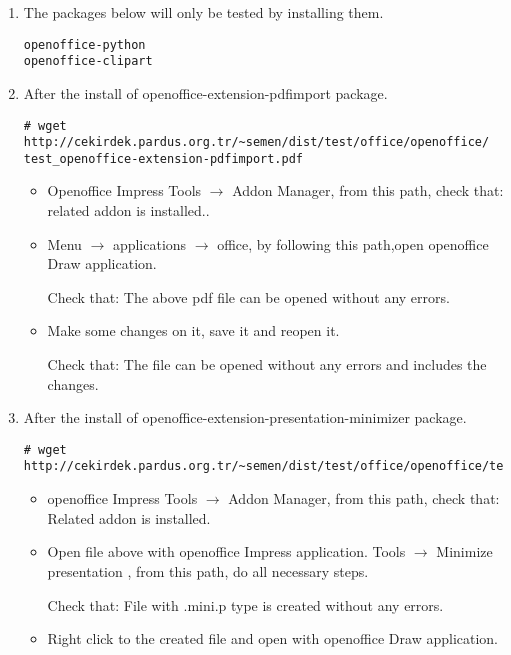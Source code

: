 \documentclass[a4paper,10pt]{article}
\begin{document}
\begin{enumerate}
 \item The packages below will only be tested by installing them.
\begin{verbatim}
openoffice-python
openoffice-clipart
\end{verbatim}

 \item After the install of openoffice-extension-pdfimport package.
\begin{verbatim}
# wget http://cekirdek.pardus.org.tr/~semen/dist/test/office/openoffice/
test_openoffice-extension-pdfimport.pdf
\end{verbatim}

\begin{itemize}
\item Openoffice Impress Tools $\rightarrow$ Addon Manager, from this path, check that: related addon is installed..

\item Menu $\rightarrow$ applications $\rightarrow$ office, by following this path,open openoffice Draw application.

Check that: The above pdf file can be opened without any errors.
\item Make some changes on it, save it and reopen it.

Check that: The file can be opened without any errors and includes the changes.

\end{itemize}
 
\item After the install of openoffice-extension-presentation-minimizer package.
\begin{verbatim}
# wget http://cekirdek.pardus.org.tr/~semen/dist/test/office/openoffice/test_ooimpress.odp
\end{verbatim}

\begin{itemize}
\item openoffice Impress Tools $\rightarrow$ Addon Manager, from this path, check that: Related addon is installed.

\item Open file above with openoffice Impress application. Tools  $\rightarrow$  Minimize presentation , from this path, do all necessary steps.

Check that: File with .mini.p type is created without any errors.

\item Right click to the created file and open with openoffice Draw application.


\end{itemize}
\end{enumerate}
\end{document}
